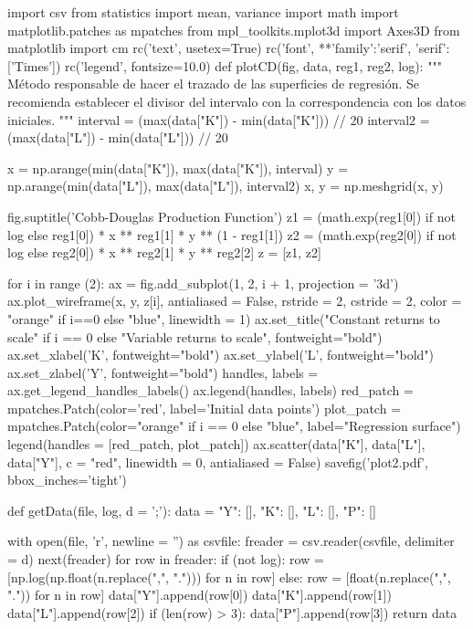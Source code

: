 \begin{pylabcode}[plotsession]
import csv
from statistics import mean, variance
import math
import matplotlib.patches as mpatches
from mpl_toolkits.mplot3d import Axes3D
from matplotlib import cm
rc('text', usetex=True)
rc('font', **{'family':'serif', 'serif':['Times']})
rc('legend', fontsize=10.0)
def plotCD(fig, data, reg1, reg2, log):
	"""
	Método responsable de hacer el trazado de las superficies de regresión.
	Se recomienda establecer el divisor del intervalo con la correspondencia con los datos iniciales.
	"""
	interval = (max(data["K"]) - min(data["K"])) // 20 
	interval2 = (max(data["L"]) - min(data["L"])) // 20
	
	x = np.arange(min(data["K"]), max(data["K"]), interval)
	y = np.arange(min(data["L"]), max(data["L"]), interval2)
	x, y = np.meshgrid(x, y)
	
	fig.suptitle('Cobb-Douglas Production Function')
	z1 = (math.exp(reg1[0]) if not log else reg1[0]) * x ** reg1[1] * y ** (1 - reg1[1])
	z2 = (math.exp(reg2[0]) if not log else reg2[0]) * x ** reg2[1] * y ** reg2[2]
	z = [z1, z2]

	for i in range (2):
		ax = fig.add_subplot(1, 2, i + 1, projection = '3d')
		ax.plot_wireframe(x, y, z[i], antialiased = False, rstride = 2, cstride = 2, color = "orange" if i==0 else "blue", linewidth = 1)
		ax.set_title("Constant returns to scale" if i == 0 else "Variable returns to scale", fontweight="bold")
		ax.set_xlabel('K', fontweight="bold")
		ax.set_ylabel('L', fontweight="bold")
		ax.set_zlabel('Y', fontweight="bold")
		handles, labels = ax.get_legend_handles_labels()
		ax.legend(handles, labels)
		red_patch = mpatches.Patch(color='red', label='Initial data points')
		plot_patch = mpatches.Patch(color="orange" if i == 0 else "blue", label="Regression surface")
		legend(handles = [red_patch, plot_patch])
		ax.scatter(data["K"], data["L"], data["Y"], c = "red", linewidth = 0, antialiased = False)
	savefig('plot2.pdf', bbox_inches='tight')

def getData(file, log, d = ';'):
	data = {"Y": [],
		"K": [],
		"L": [],
		"P": []}

	with open(file, 'r', newline = '') as csvfile:
		freader = csv.reader(csvfile, delimiter = d)
		next(freader)
		for row in freader:
			if (not log):
				row = [np.log(np.float(n.replace(",", "."))) for n in row]
			else:
				row = [float(n.replace(",", ".")) for n in row]
			data["Y"].append(row[0])
			data["K"].append(row[1])
			data["L"].append(row[2])
			if (len(row) > 3): data["P"].append(row[3])
		return data


\end{pylabcode}
